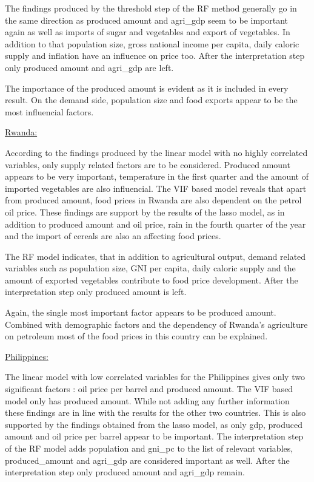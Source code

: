 \documentclass[11pt]{article}
\begin{document}
The findings produced by the threshold step of the RF method generally go in the same direction as produced amount and agri\_gdp seem to be important again as well as imports of sugar and vegetables and export of vegetables. In addition to that population size, gross national income per capita, daily caloric supply and inflation have an influence on price too. After the interpretation step only produced amount and agri\_gdp are left.

The importance of the produced amount is evident as it is included in every result. On the demand side, population size and food exports appear to be the most influencial factors. 

\begin{center} \underline{Rwanda:} \end{center}
According to the findings produced by the linear model with no highly correlated variables, only supply related factors are to be considered. Produced amount appears to be very important, temperature in the first quarter and the amount of imported vegetables are also influencial.
The VIF based model reveals that apart from produced amount, food prices in Rwanda are also dependent on the petrol oil price. 
These findings are support by the results of the lasso model, as in addition to produced amount and oil price, rain in the fourth quarter of the year and the import of cereals are also an affecting food prices.

The RF model indicates, that in addition to agricultural output, demand related variables such as population size, GNI per capita, daily caloric supply and the amount of exported vegetables contribute to food price development. After the interpretation step only produced amount is left.

Again, the single most important factor appears to be produced amount. Combined with demographic factors and the dependency of Rwanda’s agriculture on petroleum most of the food prices in this country can be explained.

\begin{center} \underline{Philippines:} \end{center}

The linear model with low correlated variables for the Philippines gives only two significant factors : oil price per barrel and produced amount. The VIF based model only has produced amount.
While not adding any further information these findings are in line with the results for the other two countries.
This is also supported by the findings obtained from the lasso model, as only gdp, produced amount and oil price per barrel appear to be important.
The interpretation step of the RF model adds population and gni\_pc to the list of relevant variables, produced\_amount and agri\_gdp are considered important as well. After the interpretation step only produced amount and agri\_gdp remain.
\end{document}
